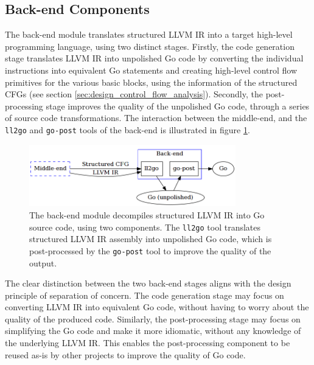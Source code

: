 
\subsection{Back-end Components}
\label{sec:design_back-end_components}

The back-end module translates structured LLVM IR into a target high-level programming language, using two distinct stages. Firstly, the code generation stage translates LLVM IR into unpolished Go code by converting the individual instructions into equivalent Go statements and creating high-level control flow primitives for the various basic blocks, using the information of the structured CFGs (see section \ref{sec:design_control_flow_analysis}). Secondly, the post-processing stage improves the quality of the unpolished Go code, through a series of source code transformations. The interaction between the middle-end, and the \texttt{ll2go} and \texttt{go-post} tools of the back-end is illustrated in figure \ref{fig:back-end}.

\begin{figure}[htbp]
	\begin{center}
		\includegraphics[width=0.8\textwidth]{inc/6_design/back-end.png}
		\caption{The back-end module decompiles structured LLVM IR into Go source code, using two components. The \texttt{ll2go} tool translates structured LLVM IR assembly into unpolished Go code, which is post-processed by the \texttt{go-post} tool to improve the quality of the output.}
		\label{fig:back-end}
	\end{center}
\end{figure}

The clear distinction between the two back-end stages aligns with the design principle of separation of concern. The code generation stage may focus on converting LLVM IR into equivalent Go code, without having to worry about the quality of the produced code. Similarly, the post-processing stage may focus on simplifying the Go code and make it more idiomatic, without any knowledge of the underlying LLVM IR. This enables the post-processing component to be reused as-is by other projects to improve the quality of Go code.

